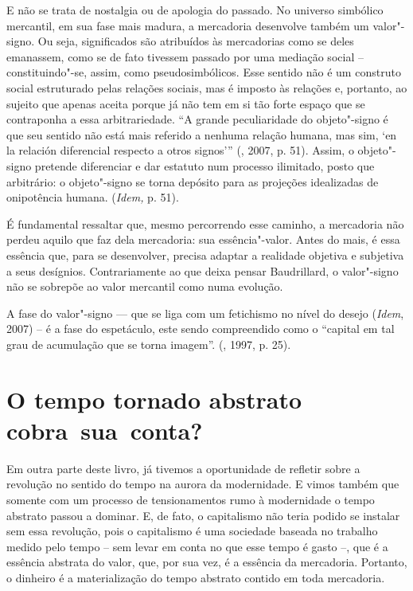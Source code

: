 E não se trata de nostalgia ou de apologia do passado. No universo
simbólico mercantil, em sua fase mais madura, a mercadoria desenvolve
também um valor"-signo. Ou seja, significados são atribuídos às
mercadorias como se deles emanassem, como se de fato tivessem passado
por uma mediação social -- constituindo"-se, assim, como
pseudosimbólicos. Esse sentido não é um construto social
estruturado pelas relações sociais, mas é imposto às relações e,
portanto, ao sujeito que apenas aceita porque já não tem em si tão forte
espaço que se contraponha a essa arbitrariedade. ``A grande
peculiaridade do objeto"-signo é que seu sentido não está mais referido a
nenhuma relação humana, mas sim, `en la relación diferencial respecto a
otros signos''' (, 2007, p. 51). Assim, o objeto"-signo pretende
diferenciar e dar estatuto num processo ilimitado, posto que arbitrário:
o objeto"-signo se torna depósito para as projeções idealizadas de
onipotência humana. (\emph{Idem,} p. 51).

É fundamental ressaltar que, mesmo percorrendo esse caminho, a
mercadoria não perdeu aquilo que faz dela mercadoria: sua
essência"-valor. Antes do mais, é essa essência que, para se desenvolver,
precisa adaptar a realidade objetiva e subjetiva a seus desígnios.
Contrariamente ao que deixa pensar Baudrillard, o valor"-signo não se
sobrepõe ao valor mercantil como numa evolução.

A fase do valor"-signo --- que se liga com um fetichismo no nível do
desejo (\emph{Idem}, 2007) -- é a fase do espetáculo, este sendo
compreendido como o ``capital em tal grau de acumulação que se torna
imagem''. (, 1997, p. 25).

\section{O tempo tornado abstrato cobra~sua~conta?}

Em outra parte deste livro, já tivemos a oportunidade de refletir sobre a revolução no sentido do tempo na aurora da
modernidade. E vimos também que somente com um processo de
tensionamentos rumo à modernidade o tempo abstrato passou a dominar. E,
de fato, o capitalismo não teria podido se instalar sem essa revolução,
pois o capitalismo é uma sociedade baseada no trabalho medido pelo tempo
-- sem levar em conta no que esse tempo é gasto --, que é a essência
abstrata do valor, que, por sua vez, é a essência da mercadoria.
Portanto, o dinheiro é a materialização do tempo abstrato contido em
toda mercadoria.

